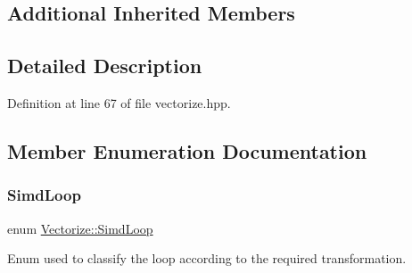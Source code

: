 \subsection*{Additional Inherited Members}


\subsection{Detailed Description}


Definition at line 67 of file vectorize.\+hpp.



\subsection{Member Enumeration Documentation}
\mbox{\label{classVectorize_a434b71764ac7af86698c3f2cee6e8a25}} 
\subsubsection{\texorpdfstring{Simd\+Loop}{SimdLoop}}
{\footnotesize\ttfamily enum \hyperlink{classVectorize_a434b71764ac7af86698c3f2cee6e8a25}{Vectorize\+::\+Simd\+Loop}\hspace{0.3cm}{\ttfamily [private]}}



Enum used to classify the loop according to the required transformation. 

